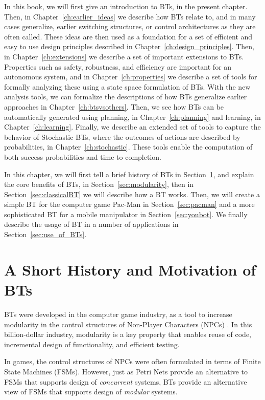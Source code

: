 In this book, we will first give an introduction to BTs, in the present chapter. Then, in Chapter~\ref{ch:earlier_ideas} we describe how BTs relate to, and in many cases generalize, earlier switching structures, or control architectures as they are often called. These ideas are then used as a foundation for a set of efficient and easy to use design principles described in Chapter~\ref{ch:design_principles}.
Then, in Chapter~\ref{ch:extensions} we describe a set of important extensions to BTs.
Properties such as safety, robustness, and efficiency are important for an autonomous system, and in Chapter~\ref{ch:properties} we describe a set of tools for formally analyzing these using a state space formulation of BTs. 
With the new analysis tools, we can formalize the descriptions of how BTs generalize earlier approaches in Chapter~\ref{ch:btsvsothers}.
Then, we see how BTs can be automatically generated using planning, in Chapter~\ref{ch:planning} and learning, in Chapter~\ref{ch:learning}.  
Finally, we describe an extended set of tools to capture the behavior of Stochastic BTs, where the outcomes of actions are described by probabilities, in Chapter~\ref{ch:stochastic}. These tools enable the computation of both success probabilities and time to completion.

In this chapter, we will first tell a brief history of BTs in Section~\ref{sec:history}, 
and explain the core benefits of BTs,  in Section~\ref{sec:modularity},
then in Section~\ref{sec:classicalBT} we will describe how a BT works.
Then, we will create a simple BT for the computer game Pac-Man in Section~\ref{sec:pacman} and a more sophisticated BT for a mobile manipulator in Section~\ref{sec:youbot}. We finally describe the usage of BT in a number of applications in Section~\ref{sec:use_of_BTs}.


\section{A Short History and Motivation of BTs}
\label{sec:history}
BTs were developed in the computer game industry, as a tool to increase
modularity in the control structures of Non-Player Characters (NPCs)\label{definition:NPC}
\cite{isla2005handling,champandard2007understanding,mateas2002abl,isla2008halo,millington2009artificial,rabin2014gameAiPro}.
In this billion-dollar industry, modularity is a key property that enables reuse of code, incremental design of functionality, and efficient testing.

In games, the control structures of NPCs were often formulated in terms of Finite State Machines (FSMs). However, just as Petri Nets \cite{murata1989petri} provide an alternative to FSMs that supports design of \emph{concurrent} systems, BTs provide an alternative view of FSMs that supports design of \emph{modular} systems.

